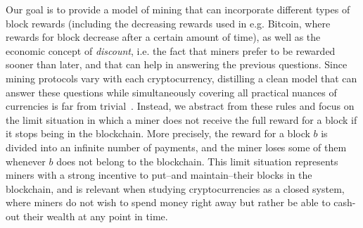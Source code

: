Our goal is to provide a model of mining that can incorporate different types of block rewards (including the decreasing rewards used in e.g. Bitcoin, where rewards for block decrease after a certain amount of time), as well as the economic concept of \emph{discount}, i.e. the fact that miners prefer to be rewarded sooner than later, and that can help in answering the previous questions. 
Since mining protocols vary with each cryptocurrency, 
distilling a clean model that can answer these questions while simultaneously covering 
all practical nuances of currencies is far from trivial~\cite{mininggames:2016}. 
Instead, we abstract from these rules and focus on the limit situation in which a miner does not receive the full reward for a block if it stops being in the blockchain. 
More precisely, the reward for a block $b$ is divided into an infinite number of payments, and the miner loses some of them whenever $b$ does not belong to the blockchain. 
This limit situation represents miners with a strong incentive to put--and maintain--their blocks in the blockchain, and is relevant when studying cryptocurrencies
as a closed system, where miners do 
not wish to spend money right away but rather be able to cash-out their wealth at any point in time. 
%
